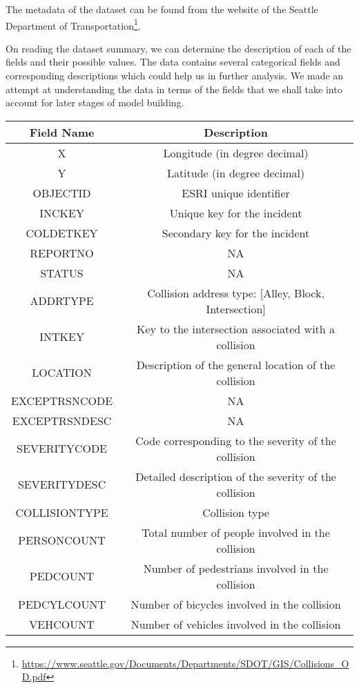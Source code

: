 \documentclass{article}
\begin{document}
The metadata of the dataset can be found from the website of the Seattle Department of Transportation\footnote[2]{\href{https://www.seattle.gov/Documents/Departments/SDOT/GIS/Collisions\_OD.pdf}{https://www.seattle.gov/Documents/Departments/SDOT/GIS/Collisions\_OD.pdf}}.

On reading the dataset summary, we can determine the description of each of the fields and their possible values. The data contains several categorical fields and corresponding descriptions which could help us in further analysis. We made an attempt at understanding the data in terms of the fields that we shall take into account for later stages of model building.

\begin{table}
  \centering
  \begin{tabular}{|c | c|} 
  \hline
  Field Name & Description\\
  \hline
  X & Longitude (in degree decimal)\\
  Y & Latitude (in degree decimal)\\
  OBJECTID & ESRI unique identifier\\
  INCKEY & Unique key for the incident\\
  COLDETKEY & Secondary key for the incident\\
  REPORTNO & NA\\
  STATUS & NA\\
  ADDRTYPE & Collision address type: [Alley, Block, Intersection]\\
  INTKEY & Key to the intersection associated with a collision \\
  LOCATION & Description of the general location of the collision \\
  EXCEPTRSNCODE & NA\\
  EXCEPTRSNDESC & NA\\
  SEVERITYCODE & Code corresponding to the severity of the collision\\
  SEVERITYDESC & Detailed description of the severity of the collision\\
  COLLISIONTYPE & Collision type\\
  PERSONCOUNT & Total number of people involved in the collision\\
  PEDCOUNT & Number of pedestrians involved in the collision\\
  PEDCYLCOUNT & Number of bicycles involved in the collision\\
  VEHCOUNT & Number of vehicles involved in the collision\\

\end{tabular}
\end{table}
\end{document}

